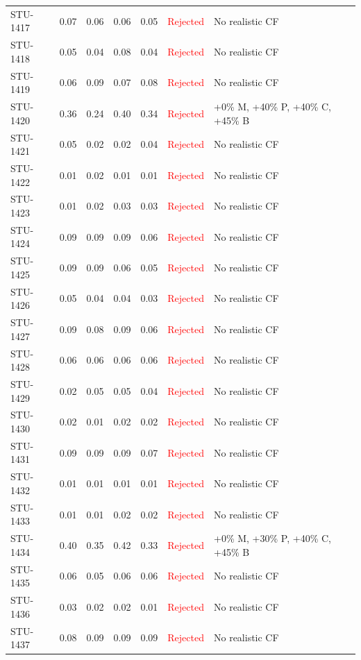 \begin{longtable}{l c c c c | c | l}
STU-1417 & 0.07 & 0.06 & 0.06 & 0.05 & \textcolor{red}{Rejected} & No realistic CF \\
STU-1418 & 0.05 & 0.04 & 0.08 & 0.04 & \textcolor{red}{Rejected} & No realistic CF \\
STU-1419 & 0.06 & 0.09 & 0.07 & 0.08 & \textcolor{red}{Rejected} & No realistic CF \\
STU-1420 & 0.36 & 0.24 & 0.40 & 0.34 & \textcolor{red}{Rejected} & +0\% M, +40\% P, +40\% C, +45\% B \\
STU-1421 & 0.05 & 0.02 & 0.02 & 0.04 & \textcolor{red}{Rejected} & No realistic CF \\
STU-1422 & 0.01 & 0.02 & 0.01 & 0.01 & \textcolor{red}{Rejected} & No realistic CF \\
STU-1423 & 0.01 & 0.02 & 0.03 & 0.03 & \textcolor{red}{Rejected} & No realistic CF \\
STU-1424 & 0.09 & 0.09 & 0.09 & 0.06 & \textcolor{red}{Rejected} & No realistic CF \\
STU-1425 & 0.09 & 0.09 & 0.06 & 0.05 & \textcolor{red}{Rejected} & No realistic CF \\
STU-1426 & 0.05 & 0.04 & 0.04 & 0.03 & \textcolor{red}{Rejected} & No realistic CF \\
STU-1427 & 0.09 & 0.08 & 0.09 & 0.06 & \textcolor{red}{Rejected} & No realistic CF \\
STU-1428 & 0.06 & 0.06 & 0.06 & 0.06 & \textcolor{red}{Rejected} & No realistic CF \\
STU-1429 & 0.02 & 0.05 & 0.05 & 0.04 & \textcolor{red}{Rejected} & No realistic CF \\
STU-1430 & 0.02 & 0.01 & 0.02 & 0.02 & \textcolor{red}{Rejected} & No realistic CF \\
STU-1431 & 0.09 & 0.09 & 0.09 & 0.07 & \textcolor{red}{Rejected} & No realistic CF \\
STU-1432 & 0.01 & 0.01 & 0.01 & 0.01 & \textcolor{red}{Rejected} & No realistic CF \\
STU-1433 & 0.01 & 0.01 & 0.02 & 0.02 & \textcolor{red}{Rejected} & No realistic CF \\
STU-1434 & 0.40 & 0.35 & 0.42 & 0.33 & \textcolor{red}{Rejected} & +0\% M, +30\% P, +40\% C, +45\% B \\
STU-1435 & 0.06 & 0.05 & 0.06 & 0.06 & \textcolor{red}{Rejected} & No realistic CF \\
STU-1436 & 0.03 & 0.02 & 0.02 & 0.01 & \textcolor{red}{Rejected} & No realistic CF \\
STU-1437 & 0.08 & 0.09 & 0.09 & 0.09 & \textcolor{red}{Rejected} & No realistic CF \\

\end{longtable}
